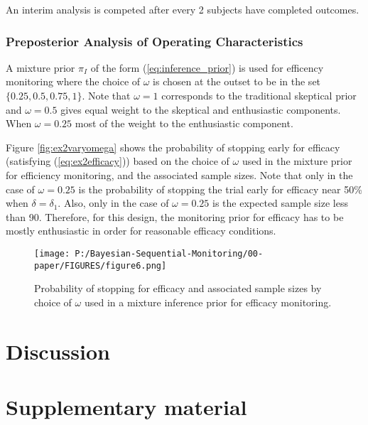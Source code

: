\documentclass[12pt]{article}
\begin{document}
An interim analysis is competed after every 2 subjects have completed outcomes.

\subsubsection{Preposterior Analysis of Operating Characteristics}\label{sec:ex2operatingcharacteristics}
A mixture prior $\pi_I$ of the form (\ref{eq:inference_prior}) is used for efficency monitoring where the choice of $\omega$ is chosen at the outset to be in the set $\{0.25,0.5,0.75,1\}$. Note that $\omega=1$ corresponds to the traditional skeptical prior and $\omega=0.5$ gives equal weight to the skeptical and enthusiastic components. When $\omega=0.25$ most of the weight to the enthusiastic component.

Figure \ref{fig:ex2varyomega} shows the probability of stopping early for efficacy (satisfying (\ref{eq:ex2efficacy})) based on the choice of $\omega$ used in the mixture prior for efficiency monitoring, and the associated sample sizes. Note that only in the case of $\omega=0.25$ is the probability of stopping the trial early for efficacy near 50\% when $\delta=\delta_1$. Also, only in the case of $\omega=0.25$ is the expected sample size less than 90. Therefore, for this design, the monitoring prior for efficacy has to be mostly enthusiastic in order for reasonable efficacy conditions.

\begin{figure}\begin{center}
    \centering\texttt{[image: P:/Bayesian-Sequential-Monitoring/00-paper/FIGURES/figure6.png]}
    \caption{Probability of stopping for efficacy and associated sample sizes by choice of $\omega$ used in a mixture inference prior for efficacy monitoring.}
\label{fig:varyomega}
 \end{center}\end{figure}


\section{Discussion}



\section{Supplementary material}
\end{document}
